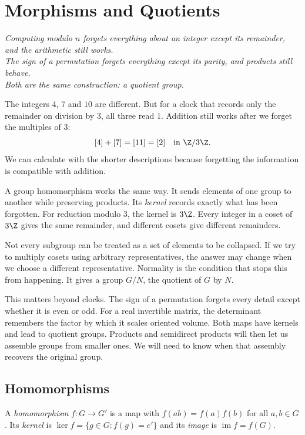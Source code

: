 \chapter{Morphisms and Quotients}

\begin{center}\itshape
Computing modulo $n$ forgets everything about an integer except its remainder, and the arithmetic still works.\\
The sign of a permutation forgets everything except its parity, and products still behave.\\
Both are the same construction: a quotient group.
\end{center}

The integers $4$, $7$ and $10$ are different. But for a clock that records only the remainder on division by $3$, all three read $1$. Addition still works after we forget the multiples of $3$:
\[
[4]+[7]=[11]=[2]\quad\text{in }\Z/3\Z.
\]
We can calculate with the shorter descriptions because forgetting the information is compatible with addition.

A group homomorphism works the same way. It sends elements of one group to another while preserving products. Its \emph{kernel} records exactly what has been forgotten. For reduction modulo $3$, the kernel is $3\Z$. Every integer in a coset of $3\Z$ gives the same remainder, and different cosets give different remainders.

Not every subgroup can be treated as a set of elements to be collapsed. If we try to multiply cosets using arbitrary representatives, the answer may change when we choose a different representative. Normality is the condition that stops this from happening. It gives a group $G/N$, the quotient of $G$ by $N$.

This matters beyond clocks. The sign of a permutation forgets every detail except whether it is even or odd. For a real invertible matrix, the determinant remembers the factor by which it scales oriented volume. Both maps have kernels and lead to quotient groups. Products and semidirect products will then let us assemble groups from smaller ones. We will need to know when that assembly recovers the original group.

\section{Homomorphisms}

\begin{definition}
A \emph{homomorphism} $f:G\to G'$ is a map with $f(ab)=f(a)f(b)$ for all $a,b\in G$. Its \emph{kernel} is $\ker f=\{g\in G:f(g)=e'\}$ and its \emph{image} is $\operatorname{im}f=f(G)$.
\end{definition}

